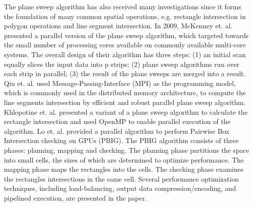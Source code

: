 The plane sweep algorithm has also received many investigations since it forms the foundation of many common spatial operations, e.g. rectangle intersection in polygon operations and line segment intersection.
In 2009, McKenney et. al. \cite{McKenney2009APP} presented a parallel version of the plane sweep algorithm, which targeted towards the small number of processing cores available on commonly available multi-core systems. The overall design of their algorithm has three steps: (1) an initial scan equally slices the input data into p strips; (2) plane sweep algorithms run over each strip in parallel; (3) the result of the plane sweeps are merged into a result. Qiu et. al. \cite{Qiu2013APS} used Message-Passing-Interface (MPI) as the programming model, which is commonly used in the distributed memory architecture, to compute the line segments intersection by efficient and robust parallel plane sweep algorithm. Khlopotine et. al. \cite{Khlopotine2013AVO} presented a variant of a plane sweep algorithm to calculate the rectangle intersection and used OpenMP to enable parallel execution of the algorithm. Lo et. al. \cite{Lo2013OptimizingPB} provided a parallel algorithm to perform Pairwise Box Intersection checking on GPUs (PBIG). The PBIG algorithm consists of three phases: planning, mapping and checking. The planning phase partitions the space into small cells, the sizes of which are determined to optimize performance. The mapping phase maps the rectangles into the cells. The checking phase examines the rectangles intersections in the same cell. Several performance optimization techniques, including load-balancing, output data compression/encoding, and pipelined execution, are presented in the paper.
